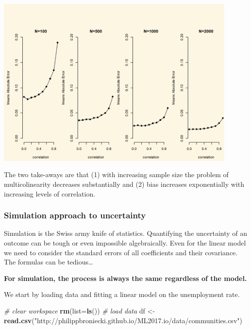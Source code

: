 \documentclass[]{article}
\newenvironment{Shaded}{\begin{snugshade}}{\end{snugshade}}
\newcommand{\CommentTok}[1]{\textcolor[rgb]{0.56,0.35,0.01}{\textit{#1}}}
\newcommand{\DataTypeTok}[1]{\textcolor[rgb]{0.13,0.29,0.53}{#1}}
\newcommand{\KeywordTok}[1]{\textcolor[rgb]{0.13,0.29,0.53}{\textbf{#1}}}
\newcommand{\NormalTok}[1]{#1}
\newcommand{\StringTok}[1]{\textcolor[rgb]{0.31,0.60,0.02}{#1}}
\begin{document}
\includegraphics[width=0.9\textwidth,height=\textheight]{./img/unnamed-chunk-178-2.png}

The two take-aways are that (1) with increasing sample size the problem of multicolinearity decreases substantially and (2) bias increases exponentially with increasing levels of correlation.

\hypertarget{simulation-approach-to-uncertainty}{%
\subsubsection{Simulation approach to uncertainty}\label{simulation-approach-to-uncertainty}}

Simulation is the Swiss army knife of statistics. Quantifying the uncertainty of an outcome can be tough or even impossible algebraically. Even for the linear model we need to consider the standard errors of all coefficients and their covariance. The formulas can be tedious\ldots{}

\textbf{For simulation, the process is always the same regardless of the model.}

We start by loading data and fitting a linear model on the unemployment rate.

\begin{Shaded}
\begin{Highlighting}[]
\CommentTok{# clear workspace}
\KeywordTok{rm}\NormalTok{(}\DataTypeTok{list=}\KeywordTok{ls}\NormalTok{())}
\CommentTok{# load data}
\NormalTok{df <-}\StringTok{ }\KeywordTok{read.csv}\NormalTok{(}\StringTok{"http://philippbroniecki.github.io/ML2017.io/data/communities.csv"}\NormalTok{)}
\end{Highlighting}
\end{Shaded}
\end{document}

